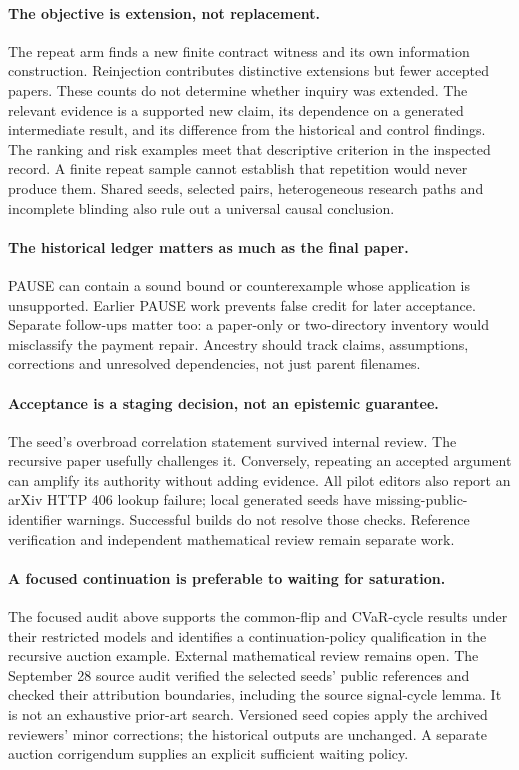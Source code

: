 \documentclass[11pt,a4paper]{article}
\begin{document}
\paragraph{The objective is extension, not replacement.}
The repeat arm finds a new finite contract witness and its own information
construction. Reinjection contributes distinctive extensions but fewer
accepted papers. These counts do not determine whether inquiry was extended.
The relevant evidence is a supported new claim, its dependence on a generated
intermediate result, and its difference from the historical and control
findings. The ranking and risk examples meet that descriptive criterion in
the inspected record. A finite repeat sample cannot establish that repetition
would never produce them. Shared seeds, selected pairs, heterogeneous research
paths and incomplete blinding also rule out a universal causal conclusion.

\paragraph{The historical ledger matters as much as the final paper.}
PAUSE can contain a sound bound or counterexample whose application is
unsupported. Earlier PAUSE work prevents false credit for later acceptance.
Separate follow-ups matter too: a paper-only or two-directory inventory would
misclassify the payment repair. Ancestry should track claims, assumptions,
corrections and unresolved dependencies, not just parent filenames.

\paragraph{Acceptance is a staging decision, not an epistemic guarantee.}
The seed's overbroad correlation statement survived internal review. The
recursive paper usefully challenges it. Conversely, repeating an accepted
argument can amplify its authority without adding evidence. All pilot
editors also report an arXiv HTTP 406 lookup failure; local generated seeds
have missing-public-identifier warnings. Successful builds do not resolve
those checks. Reference verification and independent mathematical review
remain separate work.

\paragraph{A focused continuation is preferable to waiting for saturation.}
The focused audit above supports the common-flip and CVaR-cycle results
under their restricted models and identifies a continuation-policy
qualification in the recursive auction example. External mathematical
review remains open. The September 28 source audit verified the selected
seeds' public references and checked their attribution boundaries, including
the source signal-cycle lemma. It is not an exhaustive prior-art search.
Versioned seed copies apply the archived reviewers' minor corrections;
the historical outputs are unchanged. A separate auction corrigendum supplies
an explicit sufficient waiting policy.
\end{document}
